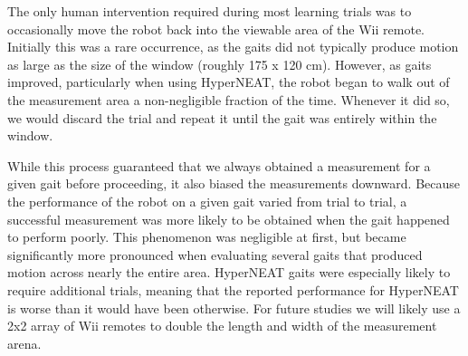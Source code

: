 
The only human intervention required during most learning trials was
to occasionally move the robot back into the viewable area of the Wii
remote.  Initially this was a rare
occurrence, as the gaits did not typically produce motion as large as
the size of the window (roughly 175 x 120 cm).  However, as gaits
improved, particularly when using HyperNEAT, the robot began to walk
out of the measurement area a non-negligible fraction of the time.
Whenever it did so, we would discard the trial and repeat it until the
gait was entirely within the window.

While this process guaranteed that we always obtained a measurement
for a given gait before proceeding, it also biased the measurements
downward.  Because the performance of the robot on a given gait varied
from trial to trial, a successful measurement was more likely to be
obtained when the gait happened to perform poorly.  This phenomenon
was negligible at first, but became significantly more pronounced when
evaluating several gaits that produced motion across nearly the entire
area.  HyperNEAT gaits were especially likely to require additional trials, meaning that the reported performance for HyperNEAT is worse than it would have been otherwise. For future studies we will likely use a 2x2 array of Wii
remotes to double the length and width of the measurement arena.

